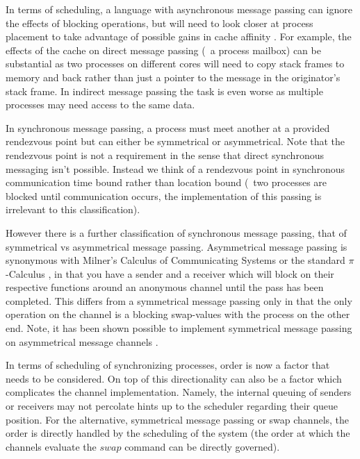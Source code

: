 In terms of scheduling, a language with asynchronous message passing can ignore the effects of blocking operations, but
will need to look closer at process placement to take advantage of possible gains in cache affinity \cite{debattista2002cache}.
For example, the effects of the cache on direct message passing (\eg~a process mailbox) can be substantial as two processes
on different cores will need to copy stack frames to memory and back rather than just a pointer to the message in the 
originator's stack frame. In indirect message passing the task is even worse as multiple processes may need access to the
same data.

In synchronous message passing, a process must meet another at a provided rendezvous point but can either be symmetrical
or asymmetrical. Note that the rendezvous point is not a requirement in the sense that direct synchronous messaging isn't 
possible. Instead we think of a rendezvous point in synchronous communication time bound rather than location bound (\ie~two
processes are blocked until communication occurs, the implementation of this passing is irrelevant to this 
classification).

However there is a further classification of synchronous message passing, that of symmetrical vs asymmetrical message passing. 
Asymmetrical message passing is synonymous with Milner's Calculus of Communicating Systems \cite{milner1982calculus} 
or the standard $\pi$-Calculus \cite{palamidessi1997comparing}, in that you have a sender and a receiver which will 
block on their respective functions around an anonymous channel until the pass has been completed. This differs from a 
symmetrical message passing only in that the only operation on the channel is a blocking swap-values with the
process on the other end. Note, it has been shown possible to implement symmetrical message passing on asymmetrical
message channels \cite{}.%

In terms of scheduling of synchronizing processes, order is now a factor that needs to be considered. On top of this 
directionality can also be a factor which complicates the channel implementation. Namely, the internal queuing of senders or
receivers may not percolate hints up to the scheduler regarding their queue position. For the alternative, symmetrical message
passing or swap channels, the order is directly handled by the scheduling of the system (\ie the order at which the channels 
evaluate the $swap$ command can be directly governed).

